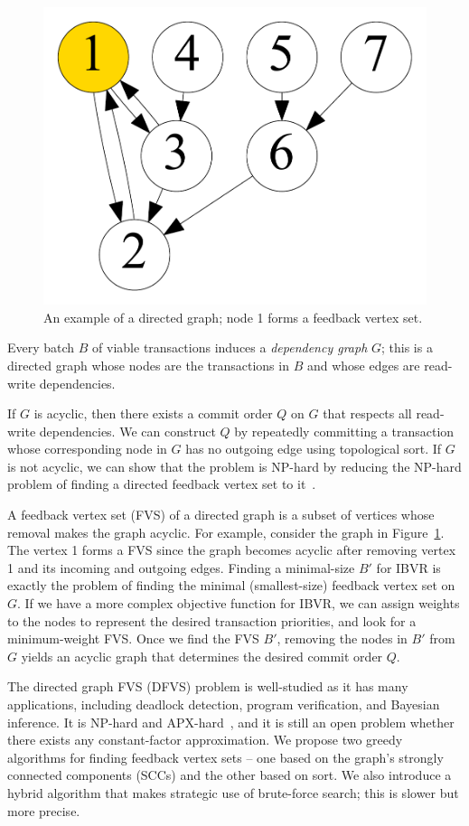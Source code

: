 \begin{figure}[t]
	\centering
	\includegraphics[width=0.3\columnwidth]{./alg_fig/fvs-eg}
	\vspace{-1em}
	\caption{An example of a directed graph; node 1 forms a feedback vertex set.}
	\vspace{-1em}
	\label{fig:fvs}
\end{figure}

Every batch $B$ of viable transactions induces a \emph{dependency graph} $G$; this is a directed graph whose nodes are the transactions in $B$ and whose edges are read-write dependencies.

If $G$ is acyclic, then there exists a commit order $Q$ on $G$ that respects all read-write dependencies. We can construct $Q$ by repeatedly committing a transaction whose corresponding node in $G$ has no outgoing edge using topological sort. If $G$ is not acyclic, we can show that the problem is NP-hard by reducing the NP-hard problem of finding a directed feedback vertex set to it~\cite{karp1972reducibility}. 

A feedback vertex set (FVS) of a directed graph is a subset of vertices whose removal makes the graph acyclic. For example, consider the graph in Figure~\ref{fig:fvs}. The vertex 1 forms a FVS since the graph becomes acyclic after removing vertex 1 and its incoming and outgoing edges. Finding a minimal-size $B'$ for IBVR is exactly the problem of finding the minimal (smallest-size) feedback vertex set on $G$. If we have a more complex objective function for IBVR, we can assign weights to the nodes to represent the desired transaction priorities, and look for a minimum-weight FVS. 
Once we find the FVS $B'$, removing the nodes in $B'$ from $G$ yields an acyclic graph that determines the desired commit order $Q$.

The directed graph FVS (DFVS) problem is well-studied as it has many applications, including deadlock detection, program verification, and Bayesian inference. It is NP-hard and APX-hard~\cite{kann1992approximability, karp1972reducibility}, and it is still an open problem whether there exists any constant-factor approximation.
We propose two greedy algorithms for finding feedback vertex sets -- one based
on the graph's strongly connected components (SCCs) and the other based on sort.
We also introduce a hybrid algorithm that makes strategic use of brute-force search; this is slower but more precise.


